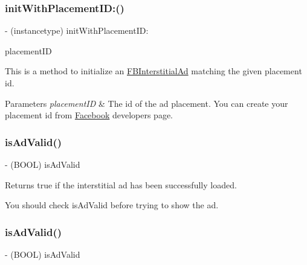 \subsubsection{\texorpdfstring{init\+With\+Placement\+I\+D\+:()}{initWithPlacementID:()}\hspace{0.1cm}{\footnotesize\ttfamily [5/5]}}
{\footnotesize\ttfamily -\/ (instancetype) init\+With\+Placement\+I\+D\+: \begin{DoxyParamCaption}\item[{(N\+S\+String $\ast$)}]{placement\+ID }\end{DoxyParamCaption}}

This is a method to initialize an \hyperlink{interfaceFBInterstitialAd}{F\+B\+Interstitial\+Ad} matching the given placement id.


\begin{DoxyParams}{Parameters}
{\em placement\+ID} & The id of the ad placement. You can create your placement id from \hyperlink{interfaceFacebook}{Facebook} developers page. \\
\hline
\end{DoxyParams}
\mbox{\label{interfaceFBInterstitialAd_aff851ea8a260430a5b09bce633826876}} 
\subsubsection{\texorpdfstring{is\+Ad\+Valid()}{isAdValid()}\hspace{0.1cm}{\footnotesize\ttfamily [1/5]}}
{\footnotesize\ttfamily -\/ (B\+O\+OL) is\+Ad\+Valid \begin{DoxyParamCaption}{ }\end{DoxyParamCaption}}

Returns true if the interstitial ad has been successfully loaded.

You should check {\ttfamily is\+Ad\+Valid} before trying to show the ad. \mbox{\label{interfaceFBInterstitialAd_aff851ea8a260430a5b09bce633826876}} 
\subsubsection{\texorpdfstring{is\+Ad\+Valid()}{isAdValid()}\hspace{0.1cm}{\footnotesize\ttfamily [2/5]}}
{\footnotesize\ttfamily -\/ (B\+O\+OL) is\+Ad\+Valid \begin{DoxyParamCaption}{ }\end{DoxyParamCaption}}

